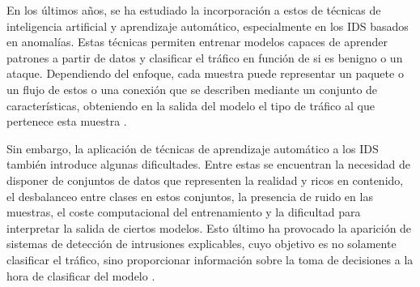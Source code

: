 En los últimos años, se ha estudiado la incorporación a estos de técnicas de inteligencia artificial y aprendizaje automático, especialmente en los IDS basados en anomalías. Estas técnicas permiten entrenar modelos capaces de aprender patrones a partir de datos y clasificar el tráfico en función de si es benigno o un ataque. Dependiendo del enfoque, cada muestra puede representar un paquete o un flujo de estos o una conexión que se describen mediante un conjunto de características, obteniendo en la salida del modelo el tipo de tráfico al que pertenece esta muestra \cite{kunal2019mlids}.

Sin embargo, la aplicación de técnicas de aprendizaje automático a los IDS también introduce algunas dificultades. Entre estas se encuentran la necesidad de disponer de conjuntos de datos que representen la realidad y ricos en contenido, el desbalanceo entre clases en estos conjuntos, la presencia de ruido en las muestras, el coste computacional del entrenamiento y la dificultad para interpretar la salida de ciertos modelos. Esto último ha provocado la aparición de sistemas de detección de intrusiones explicables, cuyo objetivo es no solamente clasificar el tráfico, sino proporcionar información sobre la toma de decisiones a la hora de clasificar del modelo \cite{neupane2022xids}.
